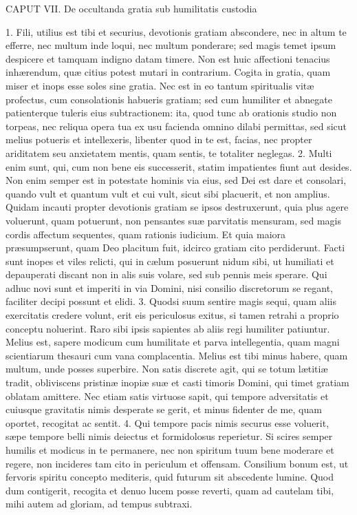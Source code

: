 \documentclass[twoside]{article}
\begin{document}
CAPUT VII.
De occultanda gratia sub humilitatis custodia

1. Fili, utilius est tibi et securius, devotionis gratiam abscondere, nec in altum te efferre, nec multum inde loqui, nec multum ponderare; sed magis temet ipsum despicere et tamquam indigno datam timere. Non est huic affectioni tenacius inhærendum, quæ citius potest mutari in contrarium. Cogita in gratia, quam miser et inops esse soles sine gratia. Nec est in eo tantum spiritualis vitæ profectus, cum consolationis habueris gratiam; sed cum humiliter et abnegate patienterque tuleris eius subtractionem: ita, quod tunc ab orationis studio non torpeas, nec reliqua opera tua ex usu facienda omnino dilabi permittas, sed sicut melius potueris et intellexeris, libenter quod in te est, facias, nec propter ariditatem seu anxietatem mentis, quam sentis, te totaliter neglegas.
2. Multi enim sunt, qui, cum non bene eis successerit, statim impatientes fiunt aut desides. Non enim semper est in potestate hominis via eius, sed Dei est dare et consolari, quando vult et quantum vult et cui vult, sicut sibi placuerit, et non amplius. Quidam incauti propter devotionis gratiam se ipsos destruxerunt, quia plus agere voluerunt, quam potuerunt, non pensantes suæ parvitatis mensuram, sed magis cordis affectum sequentes, quam rationis iudicium. Et quia maiora præsumpserunt, quam Deo placitum fuit, idcirco gratiam cito perdiderunt. Facti sunt inopes et viles relicti, qui in cælum posuerunt nidum sibi, ut humiliati et depauperati discant non in alis suis volare, sed sub pennis meis sperare. Qui adhuc novi sunt et imperiti in via Domini, nisi consilio discretorum se regant, faciliter decipi possunt et elidi.
3. Quodsi suum sentire magis sequi, quam aliis exercitatis credere volunt, erit eis periculosus exitus, si tamen retrahi a proprio conceptu noluerint. Raro sibi ipsis sapientes ab aliis regi humiliter patiuntur. Melius est, sapere modicum cum humilitate et parva intellegentia, quam magni scientiarum thesauri cum vana complacentia. Melius est tibi minus habere, quam multum, unde posses superbire. Non satis discrete agit, qui se totum lætitiæ tradit, obliviscens pristinæ inopiæ suæ et casti timoris Domini, qui timet gratiam oblatam amittere. Nec etiam satis virtuose sapit, qui tempore adversitatis et cuiusque gravitatis nimis desperate se gerit, et minus fidenter de me, quam oportet, recogitat ac sentit.
4. Qui tempore pacis nimis securus esse voluerit, sæpe tempore belli nimis deiectus et formidolosus reperietur. Si scires semper humilis et modicus in te permanere, nec non spiritum tuum bene moderare et regere, non incideres tam cito in periculum et offensam. Consilium bonum est, ut fervoris spiritu concepto mediteris, quid futurum sit abscedente lumine. Quod dum contigerit, recogita et denuo lucem posse reverti, quam ad cautelam tibi, mihi autem ad gloriam, ad tempus subtraxi.
\end{document}
